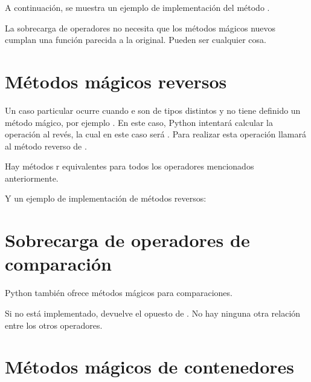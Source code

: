 
A continuación, se muestra un ejemplo de implementación del método .


La sobrecarga de operadores no necesita que los métodos mágicos nuevos cumplan una función parecida a la original.
Pueden ser cualquier cosa.
\medskip

\section{Métodos mágicos reversos}

Un caso particular ocurre cuando  e  son de tipos distintos y  no tiene definido un método mágico, por ejemplo .
En este caso, Python intentará calcular la operación al revés, la cual en este caso será .
Para realizar esta operación llamará al método reverso  de .
\medskip

Hay métodos r equivalentes para todos los operadores mencionados anteriormente.


Y un ejemplo de implementación de métodos reversos:


\section{Sobrecarga de operadores de comparación}

Python también ofrece métodos mágicos para comparaciones.


Si  no está implementado, devuelve el opuesto de .
No hay ninguna otra relación entre los otros operadores.


\section{Métodos mágicos de contenedores}

